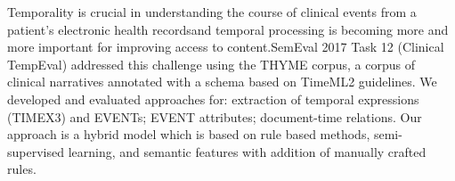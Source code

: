 Temporality is crucial in understanding the course of clinical events from a patient's electronic health recordsand temporal processing is becoming more and more important for improving access to content.SemEval 2017 Task 12 (Clinical TempEval) addressed this challenge using the THYME corpus, a corpus of clinical narratives annotated with a schema based on TimeML2 guidelines. We developed and evaluated approaches for: extraction of temporal expressions (TIMEX3) and EVENTs; EVENT attributes; document-time relations. Our approach is a hybrid model which is based on rule based methods, semi-supervised learning, and semantic features with addition of manually crafted rules.
